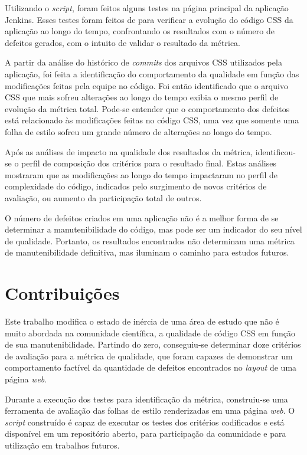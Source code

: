 Utilizando o \textit{script}, foram feitos alguns testes na página principal da aplicação Jenkins. Esses testes foram feitos de para verificar a evolução do código CSS da aplicação ao longo do tempo, confrontando os resultados com o número de defeitos gerados, com o intuito de validar o resultado da métrica.

A partir da análise do histórico de \textit{commits} dos arquivos CSS utilizados pela aplicação, foi feita a identificação do comportamento da qualidade em função das modificações feitas pela equipe no código. Foi então identificado que o arquivo CSS que mais sofreu alterações ao longo do tempo exibia o mesmo perfil de evolução da métrica total. Pode-se entender que o comportamento dos defeitos está relacionado às modificações feitas no código CSS, uma vez que somente uma folha de estilo sofreu um grande número de alterações ao longo do tempo.

Após as análises de impacto na qualidade dos resultados da métrica, identificou-se o perfil de composição dos critérios para o resultado final. Estas análises mostraram que as modificações ao longo do tempo impactaram no perfil de complexidade do código, indicados pelo surgimento de novos critérios de avaliação, ou aumento da participação total de outros.

O número de defeitos criados em uma aplicação não é a melhor forma de se determinar a manutenibilidade do código, mas pode ser um indicador do seu nível de qualidade. Portanto, os resultados encontrados não determinam uma métrica de manutenibilidade definitiva, mas iluminam o caminho para estudos futuros.

\section{Contribuições}

Este trabalho modifica o estado de inércia de uma área de estudo que não é muito abordada na comunidade científica, a qualidade de código CSS em função de sua manutenibilidade. Partindo do zero, conseguiu-se determinar doze critérios de avaliação para a métrica de qualidade, que foram capazes de demonstrar um comportamento factível da quantidade de defeitos encontrados no \textit{layout} de uma página \textit{web}. 

Durante a execução dos testes para identificação da métrica, construiu-se uma ferramenta de avaliação das folhas de estilo renderizadas em uma página \textit{web}. O \textit{script} construído é capaz de executar os testes dos critérios codificados e está disponível em um repositório aberto, para participação da comunidade e para utilização em trabalhos futuros.

